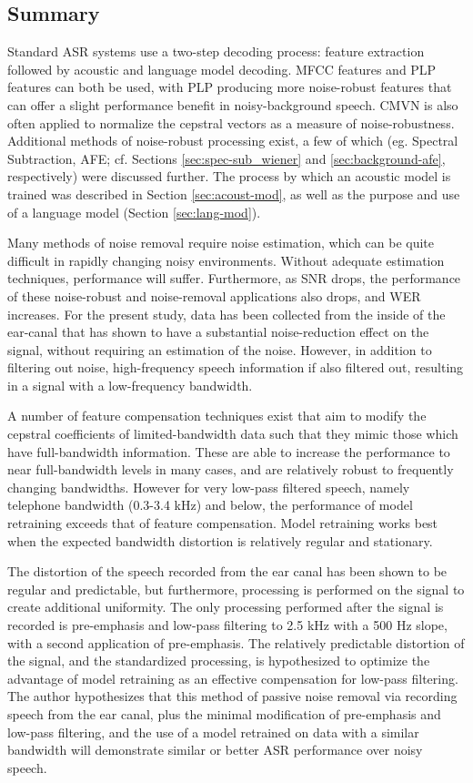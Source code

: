 \subsection{Summary}

Standard ASR systems use a two-step decoding process: feature extraction followed by acoustic and language model decoding.  MFCC features and PLP features can both be used, with PLP producing more noise-robust features that can offer a slight performance benefit in noisy-background speech.  CMVN is also often applied to normalize the cepstral vectors as a measure of noise-robustness.  Additional methods of noise-robust processing exist, a few of which (eg. Spectral Subtraction, AFE; cf. Sections \ref{sec:spec-sub_wiener} and \ref{sec:background-afe}, respectively) were discussed further. The process by which an acoustic model is trained was described in Section \ref{sec:acoust-mod}, as well as the purpose and use of a language model (Section \ref{sec:lang-mod}).

Many methods of noise removal require noise estimation, which can be quite difficult in rapidly changing noisy environments.  Without adequate estimation techniques, performance will suffer. Furthermore, as SNR drops, the performance of these noise-robust and noise-removal applications also drops, and WER increases.  For the present study, data has been collected from the inside of the ear-canal that has shown to have a substantial noise-reduction effect on the signal, without requiring an estimation of the noise.  However, in addition to filtering out noise, high-frequency speech information if also filtered out, resulting in a signal with a low-frequency bandwidth.

A number of feature compensation techniques exist that aim to modify the cepstral coefficients of limited-bandwidth data such that they mimic those which have full-bandwidth information.  These are able to increase the performance to near full-bandwidth levels in many cases, and are relatively robust to frequently changing bandwidths.  However for very low-pass filtered speech, namely telephone bandwidth (0.3-3.4 kHz) and below, the performance of model retraining exceeds that of feature compensation.  Model retraining works best when the expected bandwidth distortion is relatively regular and stationary.

The distortion of the speech recorded from the ear canal has been shown to be regular and predictable, but furthermore, processing is performed on the signal to create additional uniformity.  The only processing performed after the signal is recorded is pre-emphasis and low-pass filtering to 2.5 kHz with a 500 Hz slope, with a second application of pre-emphasis.  The relatively predictable distortion of the signal, and the standardized processing, is hypothesized to optimize the advantage of model retraining as an effective compensation for low-pass filtering.  The author hypothesizes that this method of passive noise removal via recording speech from the ear canal, plus the minimal modification of pre-emphasis and low-pass filtering, and the use of a model retrained on data with a similar bandwidth will demonstrate similar or better ASR performance over noisy speech.


